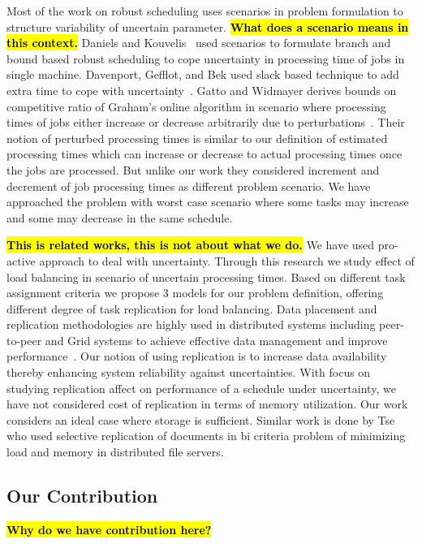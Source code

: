 \documentclass[10pt, conference, compsocconf]{IEEEtran}
\newcommand{\todo}[1]{{\color{red}\textbf{\hl{#1}}\xspace}}
\begin{document}
Most of the work on robust scheduling uses scenarios in problem
formulation to structure variability of uncertain
parameter. \todo{What does a scenario means in this context.} Daniels
and Kouvelis~\cite{citeulike:8334169} used scenarios to formulate
branch and bound based robust scheduling to cope uncertainty in
processing time of jobs in single machine. Davenport, Gefflot, and Bek
used slack based technique to add extra time to cope with
uncertainty~\cite{Davenport_slack-basedtechniques}. Gatto and Widmayer
derives bounds on competitive ratio of Graham’s online algorithm in
scenario where processing times of jobs either increase or decrease
arbitrarily due to perturbations~\cite{Gatto07}.  Their notion of
perturbed processing times is similar to our definition of estimated
processing times which can increase or decrease to actual processing
times once the jobs are processed. But unlike our work they considered
increment and decrement of job processing times as different problem
scenario. We have approached the problem with worst case scenario
where some tasks may increase and some may decrease in the same
schedule.
  
\todo{This is related works, this is not about what we do.} We have
used pro-active approach to deal with uncertainty. Through this
research we study effect of load balancing in scenario of uncertain
processing times. Based on different task assignment criteria we
propose 3 models for our problem definition, offering different degree
of task replication for load balancing. Data placement and replication
methodologies are highly used in distributed systems including
peer-to-peer and Grid systems to achieve effective data management and
improve
performance~\cite{Cirne2007213}\cite{Abawajy}\cite{4215379}. Our
notion of using replication is to increase data availability thereby
enhancing system reliability against uncertainties. With focus on
studying replication affect on performance of a schedule under
uncertainty, we have not considered cost of replication in terms of
memory utilization. Our work considers an ideal case where storage is
sufficient.  Similar work is done by Tse~\cite{DBLP:journals/tc/Tse12}
who used selective replication of documents in bi criteria problem of
minimizing load and memory in distributed file servers.


\subsection{Our Contribution}

\todo{Why do we have contribution here?}
\end{document}
